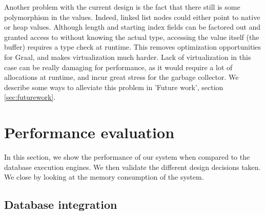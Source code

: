\documentclass[twoside,11pt,a4paper]{article}
\newcommand{\startsection}[1]{
	\cleardoublepage
	\section{#1}
	\thispagestyle{basic}
}
\begin{document}
Another problem with the current design is the fact that there still is some polymorphism in the values. Indeed, linked list nodes could either point to native or heap values. Although length and starting index fields can be factored out and granted access to without knowing the actual type, accessing the value itself (the buffer) requires a type check at runtime. This removes optimization opportunities for Graal, and makes virtualization much harder. Lack of virtualization in this case can be really damaging for performance, as it would require a lot of allocations at runtime, and incur great stress for the garbage collector. We describe some ways to alleviate this problem in 'Future work', section \ref{sec:futurework}.

\startsection{Performance evaluation}
\label{sec:benchmarks}

In this section, we show the performance of our system when compared to the database execution engines. We then validate the different design decisions taken. We close by looking at the memory consumption of the system.


\subsection{Database integration}

\end{document}
